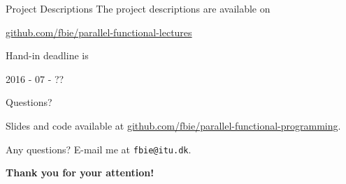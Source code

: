 \documentclass{beamer}
\begin{document}
\begin{frame}{Project Descriptions}
  The project descriptions are available on

  \begin{center}
    \url{github.com/fbie/parallel-functional-lectures}
  \end{center}

  Hand-in deadline is

  \begin{center}
    2016 - 07 - ??
  \end{center}
\end{frame}

\begin{frame}{Questions?}
  \begin{center}
    Slides and code available at \url{github.com/fbie/parallel-functional-programming}.
  \end{center}

  \pause{}

  \begin{center}
    Any questions? E-mail me at \texttt{fbie@itu.dk}.
  \end{center}

  \pause{}

  \begin{center}
    \textbf{Thank you for your attention!}
  \end{center}
\end{frame}
\end{document}
